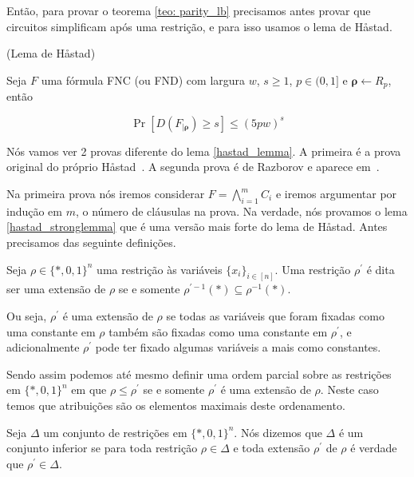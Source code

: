 Então, para provar o teorema \ref{teo: parity_lb} precisamos antes provar que circuitos simplificam após uma restrição, e para isso usamos o lema de Håstad.

\begin{lema} (Lema de Håstad) \label{hastad_lemma}

Seja $F$ uma fórmula FNC (ou FND) com largura $w$, $s \geq 1$, $p \in (0, 1]$ e $\boldsymbol{\rho} \leftarrow R_{p}$, então

\begin{equation*}
	\Pr[D(F_{\lvert \boldsymbol{\boldsymbol{\rho}}}) \geq s] \leq (5pw)^{s}
\end{equation*}

\end{lema}

Nós vamos ver 2 provas diferente do lema \ref{hastad_lemma}. A primeira é a prova original do próprio Håstad~\cite{haastad1987computational}. A segunda prova é de Razborov e aparece em~\cite{beame1994switching}.

Na primeira prova nós iremos considerar $F = \bigwedge_{i = 1}^{m} C_{i}$ e iremos argumentar por indução em $m$, o número de cláusulas na prova. Na verdade, nós provamos o lema \ref{hastad_stronglemma} que é uma versão mais forte do lema de H{\aa}stad. Antes precisamos das seguinte definições.

\begin{defi} 

Seja $\rho \in \{*, 0, 1\}^{n}$ uma restrição às variáveis $\{x_{i} \}_{i \in [n]}$. Uma restrição $\rho^{\prime}$ é dita ser uma extensão de $\rho$ se e somente $\rho^{\prime -1}(*) \subseteq \rho^{-1}(*)$.

\end{defi}

Ou seja, $\rho^{\prime}$ é uma extensão de $\rho$ se todas as variáveis que foram fixadas como uma constante em $\rho$ também são fixadas como uma constante em $\rho^{\prime}$, e adicionalmente $\rho^{\prime}$ pode ter fixado algumas variáveis a mais como constantes. 

Sendo assim podemos até mesmo definir uma ordem parcial sobre as restrições em $\{*, 0, 1\}^{n}$ em que $\rho \leq \rho^{\prime}$ se e somente $\rho^{\prime}$ é uma extensão de $\rho$. Neste caso temos que atribuições são os elementos maximais deste ordenamento.

\begin{defi} 

Seja $\Delta$ um conjunto de restrições em $\{*, 0, 1\}^{n}$. Nós dizemos que $\Delta$ é um conjunto inferior se para toda restrição $\rho \in \Delta$ e toda extensão $\rho^{\prime}$ de $\rho$ é verdade que $\rho^{\prime} \in \Delta$.

\end{defi}

